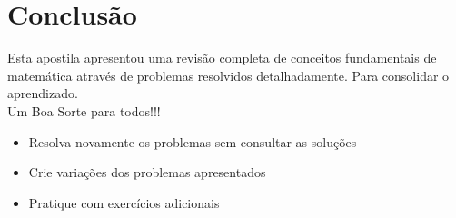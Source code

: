 \documentclass[11pt]{article}
\begin{document}
\section{Conclusão}
Esta apostila apresentou uma revisão completa de conceitos fundamentais de matemática através de problemas resolvidos detalhadamente. Para consolidar o aprendizado. \\

Um Boa Sorte para todos!!!

\begin{itemize}
\item Resolva novamente os problemas sem consultar as soluções
\item Crie variações dos problemas apresentados
\item Pratique com exercícios adicionais
\end{itemize}
\end{document}
